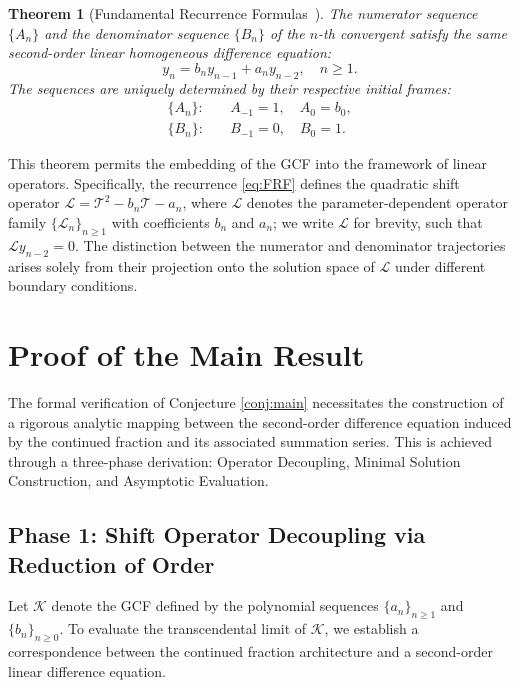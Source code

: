 \documentclass[pdflatex,sn-mathphys-num]{sn-jnl}
\theoremstyle{thmstyleone}
\newtheorem{theorem}{Theorem}[section]
\theoremstyle{thmstyletwo}
\theoremstyle{thmstylethree}
\begin{document}
	\begin{theorem}[Fundamental Recurrence Formulas~{\cite[Ch.\,1]{wall1948analytic}}]\label{the:Wallis-Euler Recurrence Theorem}
		The numerator sequence $\{A_n\}$ and the denominator sequence $\{B_n\}$ of the $n$-th convergent satisfy the same second-order linear homogeneous difference equation:
		\begin{equation}\label{eq:FRF}
			y_n = b_n y_{n-1} + a_n y_{n-2}, \quad n \ge 1.
		\end{equation}
		The sequences are uniquely determined by their respective initial frames:
		\begin{align}
			\{A_n\}: & \quad A_{-1} = 1, \quad A_0 = b_0, \\
			\{B_n\}: & \quad B_{-1} = 0, \quad B_0 = 1.
		\end{align}
	\end{theorem}
	
	This theorem permits the embedding of the GCF into the framework of linear operators. Specifically, the recurrence \eqref{eq:FRF} defines the quadratic shift operator $\mathcal{L} = \mathcal{T}^2 - b_n \mathcal{T} - a_n$, where $\mathcal{L}$ denotes the parameter-dependent operator family $\{\mathcal{L}_n\}_{n \ge 1}$ with coefficients $b_n$ and $a_n$; we write $\mathcal{L}$ for brevity, such that $\mathcal{L}y_{n-2}=0$. The distinction between the numerator and denominator trajectories arises solely from their projection onto the solution space of $\mathcal{L}$ under different boundary conditions.
	
	\section{Proof of the Main Result}
	The formal verification of Conjecture \ref{conj:main} necessitates the construction of a rigorous analytic mapping between the second-order difference equation induced by the continued fraction and its associated summation series. This is achieved through a three-phase derivation: Operator Decoupling, Minimal Solution Construction, and Asymptotic Evaluation.
	
	\subsection{Phase 1: Shift Operator Decoupling via Reduction of Order}
	Let $\mathcal{K}$ denote the GCF defined by the polynomial sequences $\{a_n\}_{n \ge 1}$ and $\{b_n\}_{n \ge 0}$. To evaluate the transcendental limit of $\mathcal{K}$, we establish a correspondence between the continued fraction architecture and a second-order linear difference equation.
	
\end{document}
